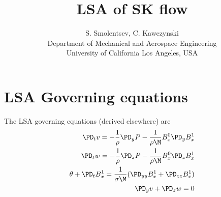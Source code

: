 \documentclass[11pt]{article}
\begin{document}
\doublespacing
\title{LSA of SK flow}
\author{S. Smolentsev, C. Kawczynski \\
Department of Mechanical and Aerospace Engineering \\
University of California Los Angeles, USA\\
}
\maketitle

\section{LSA Governing equations}

The LSA governing equations (derived elsewhere) are
\begin{equation}\begin{aligned}
\PD_t v = -\frac{1}{\rho}\PD_y P - \frac{1}{\rho \M} B_x^0 \PD_y B_x^{1} \\
\PD_t w = -\frac{1}{\rho}\PD_z P - \frac{1}{\rho \M} B_x^0 \PD_z B_x^{1} \\
\theta + \PD_t B_x^{1} = \frac{1}{\sigma \M} (\PD_{yy} B_x^{1}+\PD_{zz} B_x^{1}) \\
\PD_y v + \PD_z w = 0  \\
\end{aligned} \end{equation}
\end{document}
